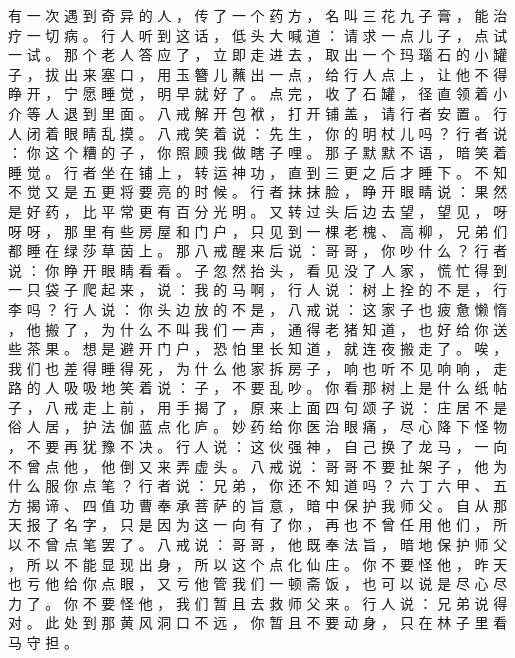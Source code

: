 {有 一 次 遇 到 奇 异 的 人 ， 传 了 一 个 药 方 ， 名 叫 三 花 九 子 膏 ， 能 治 疗 一 切 病 。
行 人 听 到 这 话 ， 低 头 大 喊 道 ： 请 求 一 点 儿 子 ， 点 试 一 试 。
那 个 老 人 答 应 了 ， 立 即 走 进 去 ， 取 出 一 个 玛 瑙 石 的 小 罐 子 ， 拔 出 来 塞 口 ， 用 玉 簪 儿 蘸 出 一 点 ， 给 行 人 点 上 ， 让 他 不 得 睁 开 ， 宁 愿 睡 觉 ， 明 早 就 好 了 。
点 完 ， 收 了 石 罐 ， 径 直 领 着 小 介 等 人 退 到 里 面 。
八 戒 解 开 包 袱 ， 打 开 铺 盖 ， 请 行 者 安 置 。
行 人 闭 着 眼 睛 乱 摸 。
八 戒 笑 着 说 ： 先 生 ， 你 的 明 杖 儿 吗 ？ 行 者 说 ： 你 这 个 糟 的 子 ， 你 照 顾 我 做 瞎 子 哩 。
那 子 默 默 不 语 ， 暗 笑 着 睡 觉 。
行 者 坐 在 铺 上 ， 转 运 神 功 ， 直 到 三 更 之 后 才 睡 下 。
不 知 不 觉 又 是 五 更 将 要 亮 的 时 候 。
行 者 抹 抹 脸 ， 睁 开 眼 睛 说 ： 果 然 是 好 药 ， 比 平 常 更 有 百 分 光 明 。
又 转 过 头 后 边 去 望 ， 望 见 ， 呀 呀 呀 ， 那 里 有 些 房 屋 和 门 户 ， 只 见 到 一 棵 老 槐 、 高 柳 ， 兄 弟 们 都 睡 在 绿 莎 草 茵 上 。
那 八 戒 醒 来 后 说 ： 哥 哥 ， 你 吵 什 么 ？ 行 者 说 ： 你 睁 开 眼 睛 看 看 。
子 忽 然 抬 头 ， 看 见 没 了 人 家 ， 慌 忙 得 到 一 只 袋 子 爬 起 来 ， 说 ： 我 的 马 啊 ， 行 人 说 ： 树 上 拴 的 不 是 ， 行 李 吗 ？ 行 人 说 ： 你 头 边 放 的 不 是 ， 八 戒 说 ： 这 家 子 也 疲 惫 懒 惰 ， 他 搬 了 ， 为 什 么 不 叫 我 们 一 声 ， 通 得 老 猪 知 道 ， 也 好 给 你 送 些 茶 果 。
想 是 避 开 门 户 ， 恐 怕 里 长 知 道 ， 就 连 夜 搬 走 了 。
唉 ， 我 们 也 差 得 睡 得 死 ， 为 什 么 他 家 拆 房 子 ， 响 也 听 不 见 响 响 ， 走 路 的 人 吸 吸 地 笑 着 说 ： 子 ， 不 要 乱 吵 。
你 看 那 树 上 是 什 么 纸 帖 子 ， 八 戒 走 上 前 ， 用 手 揭 了 ， 原 来 上 面 四 句 颂 子 说 ： 庄 居 不 是 俗 人 居 ， 护 法 伽 蓝 点 化 庐 。
妙 药 给 你 医 治 眼 痛 ， 尽 心 降 下 怪 物 ， 不 要 再 犹 豫 不 决 。
行 人 说 ： 这 伙 强 神 ， 自 己 换 了 龙 马 ， 一 向 不 曾 点 他 ， 他 倒 又 来 弄 虚 头 。
八 戒 说 ： 哥 哥 不 要 扯 架 子 ， 他 为 什 么 服 你 点 笔 ？ 行 者 说 ： 兄 弟 ， 你 还 不 知 道 吗 ？
六 丁 六 甲 、 五 方 揭 谛 、 四 值 功 曹 奉 承 菩 萨 的 旨 意 ， 暗 中 保 护 我 师 父 。
自 从 那 天 报 了 名 字 ， 只 是 因 为 这 一 向 有 了 你 ， 再 也 不 曾 任 用 他 们 ， 所 以 不 曾 点 笔 罢 了 。
八 戒 说 ： 哥 哥 ， 他 既 奉 法 旨 ， 暗 地 保 护 师 父 ， 所 以 不 能 显 现 出 身 ， 所 以 这 个 点 化 仙 庄 。
你 不 要 怪 他 ， 昨 天 也 亏 他 给 你 点 眼 ， 又 亏 他 管 我 们 一 顿 斋 饭 ， 也 可 以 说 是 尽 心 尽 力 了 。
你 不 要 怪 他 ， 我 们 暂 且 去 救 师 父 来 。
行 人 说 ： 兄 弟 说 得 对 。
此 处 到 那 黄 风 洞 口 不 远 ， 你 暂 且 不 要 动 身 ， 只 在 林 子 里 看 马 守 担 。
}
